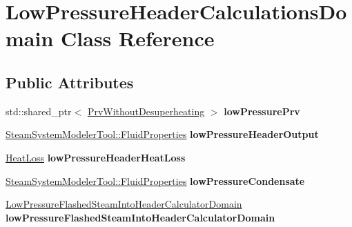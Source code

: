 \hypertarget{class_low_pressure_header_calculations_domain}{}\section{Low\+Pressure\+Header\+Calculations\+Domain Class Reference}
\label{class_low_pressure_header_calculations_domain}
\subsection*{Public Attributes}
\begin{DoxyCompactItemize}
\item 
\mbox{\label{class_low_pressure_header_calculations_domain_a7a0f7a4e715b3a40a850643cb0bc9e72}} 
std\+::shared\+\_\+ptr$<$ \hyperlink{class_prv_without_desuperheating}{Prv\+Without\+Desuperheating} $>$ {\bfseries low\+Pressure\+Prv}
\item 
\mbox{\label{class_low_pressure_header_calculations_domain_a6b73d26ef834e3de5f9828547f9f90ab}} 
\hyperlink{struct_steam_system_modeler_tool_1_1_fluid_properties}{Steam\+System\+Modeler\+Tool\+::\+Fluid\+Properties} {\bfseries low\+Pressure\+Header\+Output}
\item 
\mbox{\label{class_low_pressure_header_calculations_domain_acc5fb29c5a03c477ed01fa6159ac8a84}} 
\hyperlink{class_heat_loss}{Heat\+Loss} {\bfseries low\+Pressure\+Header\+Heat\+Loss}
\item 
\mbox{\label{class_low_pressure_header_calculations_domain_aa4330681a826dcb0503b16ef0b7842d2}} 
\hyperlink{struct_steam_system_modeler_tool_1_1_fluid_properties}{Steam\+System\+Modeler\+Tool\+::\+Fluid\+Properties} {\bfseries low\+Pressure\+Condensate}
\item 
\mbox{\label{class_low_pressure_header_calculations_domain_a9dde2c30fd13337abcc6242b283b96ba}} 
\hyperlink{class_low_pressure_flashed_steam_into_header_calculator_domain}{Low\+Pressure\+Flashed\+Steam\+Into\+Header\+Calculator\+Domain} {\bfseries low\+Pressure\+Flashed\+Steam\+Into\+Header\+Calculator\+Domain}
\end{DoxyCompactItemize}
